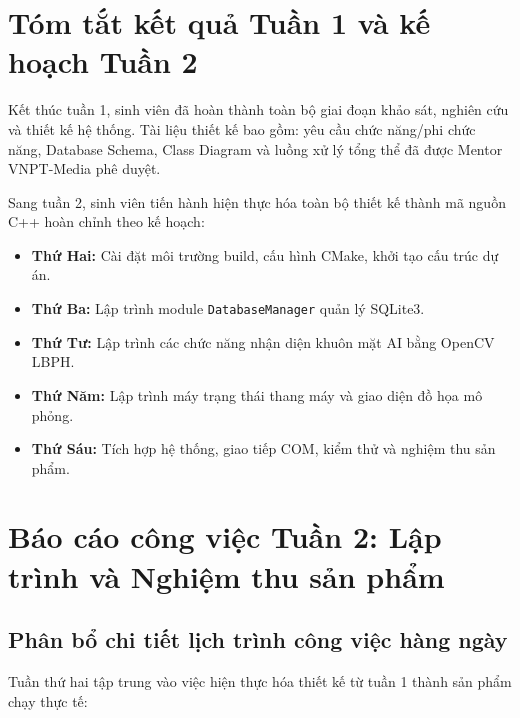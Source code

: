 \documentclass[12pt,a4paper]{article}
\begin{document}

\section{Tóm tắt kết quả Tuần 1 và kế hoạch Tuần 2}

Kết thúc tuần 1, sinh viên đã hoàn thành toàn bộ giai đoạn khảo sát, nghiên cứu và thiết kế hệ thống. Tài liệu thiết kế bao gồm: yêu cầu chức năng/phi chức năng, Database Schema, Class Diagram và luồng xử lý tổng thể đã được Mentor VNPT-Media phê duyệt.

Sang tuần 2, sinh viên tiến hành hiện thực hóa toàn bộ thiết kế thành mã nguồn C++ hoàn chỉnh theo kế hoạch:

\begin{itemize}
    \item \textbf{Thứ Hai:} Cài đặt môi trường build, cấu hình CMake, khởi tạo cấu trúc dự án.
    \item \textbf{Thứ Ba:} Lập trình module \texttt{DatabaseManager} quản lý SQLite3.
    \item \textbf{Thứ Tư:} Lập trình các chức năng nhận diện khuôn mặt AI bằng OpenCV LBPH.
    \item \textbf{Thứ Năm:} Lập trình máy trạng thái thang máy và giao diện đồ họa mô phỏng.
    \item \textbf{Thứ Sáu:} Tích hợp hệ thống, giao tiếp COM, kiểm thử và nghiệm thu sản phẩm.
\end{itemize}

\newpage

\section{Báo cáo công việc Tuần 2: Lập trình và Nghiệm thu sản phẩm}

\subsection{Phân bổ chi tiết lịch trình công việc hàng ngày}

Tuần thứ hai tập trung vào việc hiện thực hóa thiết kế từ tuần 1 thành sản phẩm chạy thực tế:
\end{document}

